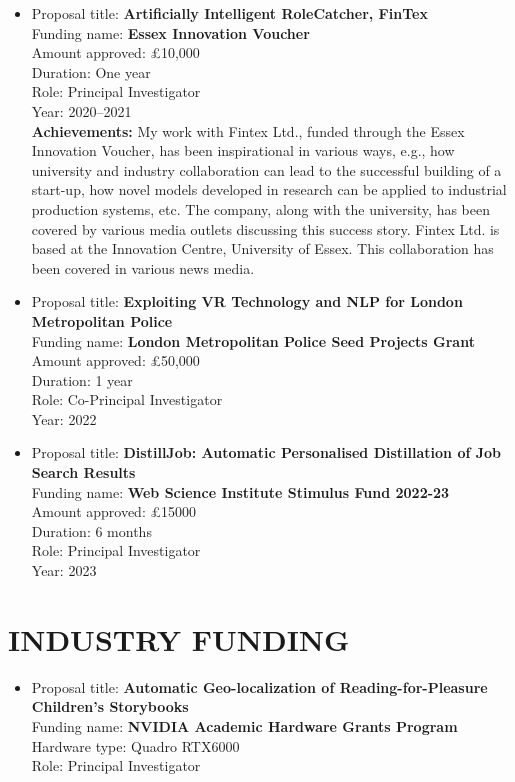 \documentclass[margin]{res}
\begin{document}
\begin{resume}
\begin{itemize}
    \item Proposal title: \textbf{Artificially Intelligent RoleCatcher, FinTex} \\
    Funding name: \textbf{Essex Innovation Voucher} \\
    Amount approved: \pounds10,000 \\
    Duration: One year \\
    Role: Principal Investigator \\
    Year: 2020--2021 \\
    \textbf{Achievements:} My work with Fintex Ltd., funded through the Essex Innovation Voucher, has been inspirational in various ways, e.g., how university and industry collaboration can lead to the successful building of a start-up, how novel models developed in research can be applied to industrial production systems, etc. The company, along with the university, has been covered by various media outlets discussing this success story. Fintex Ltd. is based at the Innovation Centre, University of Essex. This collaboration has been covered in various news media.
    
\item Proposal title: \textbf{Exploiting VR Technology and NLP for London Metropolitan Police} \\
Funding name: \textbf{London Metropolitan Police Seed Projects Grant} \\
Amount approved: \pounds50,000 \\
Duration: 1 year \\
Role: Co-Principal Investigator \\
Year: 2022

\item Proposal title: \textbf{DistillJob: Automatic Personalised Distillation of Job Search Results} \\
Funding name: \textbf{Web Science Institute Stimulus Fund 2022-23} \\
Amount approved: \pounds15000 \\
Duration: 6 months \\
Role: Principal Investigator \\
Year: 2023
\end{itemize}

\section{INDUSTRY FUNDING}
\begin{itemize}
\item Proposal title: \textbf{Automatic Geo-localization of Reading-for-Pleasure Children's Storybooks}\\
Funding name: \textbf{NVIDIA Academic Hardware Grants Program}\\
Hardware type: Quadro RTX6000 \\
Role: Principal Investigator


\end{itemize}
\end{resume}
\end{document}
